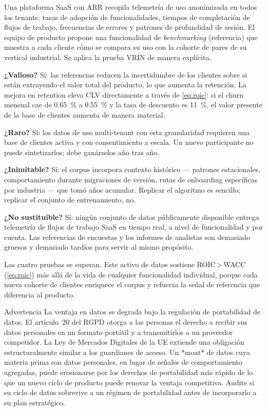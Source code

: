 \begin{example}
Una plataforma SaaS con  ARR recopila telemetría de uso anonimizada en todos los
tenants: tasas de adopción de funcionalidades, tiempos de completación de flujos de trabajo,
frecuencias de errores y patrones de profundidad de sesión. El equipo de producto propone una
funcionalidad de \emph{benchmarking} (referencia) que muestra a cada cliente cómo se compara su
uso con la cohorte de pares de su vertical industrial. Se aplica la prueba VRIN de manera explícita.

\textbf{¿Valioso?} Sí: las referencias reducen la incertidumbre de los clientes sobre si están
extrayendo el valor total del producto, lo que aumenta la retención. La mejora en retention eleva
CLV directamente a través de \cref{eq:roic}: si el churn mensual cae de \qty{0.65}{\percent} a
\qty{0.55}{\percent} y la tasa de descuento es \qty{11}{\percent}, el valor presente de la base de
clientes aumenta de manera material.

\textbf{¿Raro?} Sí: los datos de uso multi-tenant con esta granularidad requieren una base de
clientes activa y con consentimiento a escala. Un nuevo participante no puede sintetizarlos; debe
ganárselos año tras año.

\textbf{¿Inimitable?} Sí: el corpus incorpora contexto histórico — patrones estacionales,
comportamiento durante migraciones de versión, rutas de onboarding específicas por industria —
que tomó años acumular. Replicar el algoritmo es sencillo; replicar el conjunto de entrenamiento, no.

\textbf{¿No sustituible?} Sí: ningún conjunto de datos públicamente disponible entrega telemetría
de flujos de trabajo SaaS en tiempo real, a nivel de funcionalidad y por cuenta. Las referencias
de encuestas y los informes de analistas son demasiado gruesos y demasiado tardíos para servir
al mismo propósito.

Las cuatro pruebas se superan. Este activo de datos sostiene ROIC\,>\,WACC (\cref{eq:roic}) más
allá de la vida de cualquier funcionalidad individual, porque cada nueva cohorte de clientes enriquece
el corpus y refuerza la señal de referencia que diferencia al producto.
\end{example}

\begin{admonition}{Advertencia}
La ventaja en datos se degrada bajo la regulación de portabilidad de datos. El artículo~20 del RGPD
otorga a las personas el derecho a recibir sus datos personales en un formato portátil y a
transmitirlos a un proveedor competidor. La Ley de Mercados Digitales de la UE extiende una
obligación estructuralmente similar a los guardianes de acceso. Un *moat* de datos cuya materia
prima son datos personales, en lugar de señales de comportamiento agregadas, puede erosionarse
por los derechos de portabilidad más rápido de lo que un nuevo ciclo de producto puede renovar
la ventaja competitiva. Audite si su ciclo de datos sobrevive a un régimen de portabilidad antes
de incorporarlo a su plan estratégico.
\end{admonition}

